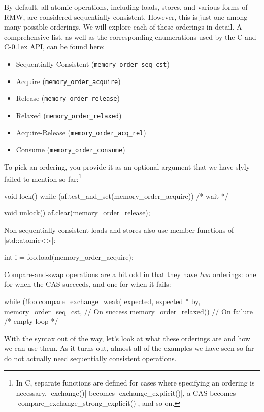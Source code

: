 \documentclass[fontsize=10pt, oneside]{scrartcl}
\newcommand{\monobox}[1]{\mbox{\texttt{#1}}}
\newcommand{\cplusplus}[1]{C\kern-0.1ex\raisebox{0.15ex}{\texttt{++}}#1}
\newcommand{\clang}[1]{C#1}
\begin{document}
By default, all atomic operations, including loads, stores, and various forms of \textsc{RMW},
are considered sequentially consistent.
However, this is just one among many possible orderings.
We will explore each of these orderings in detail.
A comprehensive list, as well as the corresponding enumerations used by the \clang{} and \cplusplus{} \textsc{API}, can be found here:
\begin{itemize}
\item Sequentially Consistent (\monobox{memory\_order\_seq\_cst})
\item Acquire (\monobox{memory\_order\_acquire})
\item Release (\monobox{memory\_order\_release})
\item Relaxed (\monobox{memory\_order\_relaxed})
\item Acquire-Release (\monobox{memory\_order\_acq\_rel})
\item Consume (\monobox{memory\_order\_consume})
\end{itemize}
To pick an ordering,
you provide it as an optional argument that we have slyly failed to mention so far:\footnote{%
In \clang{}, separate functions are defined for cases where specifying an ordering is necessary.
\cc|exchange()| becomes \cc|exchange_explicit()|, a \textsc{CAS}
becomes \cc|compare_exchange_strong_explicit()|, and so on.}
\begin{cppcode}
void lock()
{
    while (af.test_and_set(memory_order_acquire)) { /* wait */ }
}

void unlock()
{
    af.clear(memory_order_release);
}
\end{cppcode}
Non-sequentially consistent loads and stores also use member functions of \cpp|std::atomic<>|:
\begin{cppcode}
int i = foo.load(memory_order_acquire);
\end{cppcode}
Compare-and-swap operations are a bit odd in that they have \emph{two} orderings: one for when the \textsc{CAS} succeeds, and one for when it fails:
\begin{cppcode}
while (!foo.compare_exchange_weak(
    expected, expected * by,
    memory_order_seq_cst, // On success
    memory_order_relaxed)) // On failure
    { /* empty loop */ }
\end{cppcode}

With the syntax out of the way,
let's look at what these orderings are and how we can use them.
As it turns out, almost all of the examples we have seen so far do not actually need sequentially consistent operations.
\end{document}
